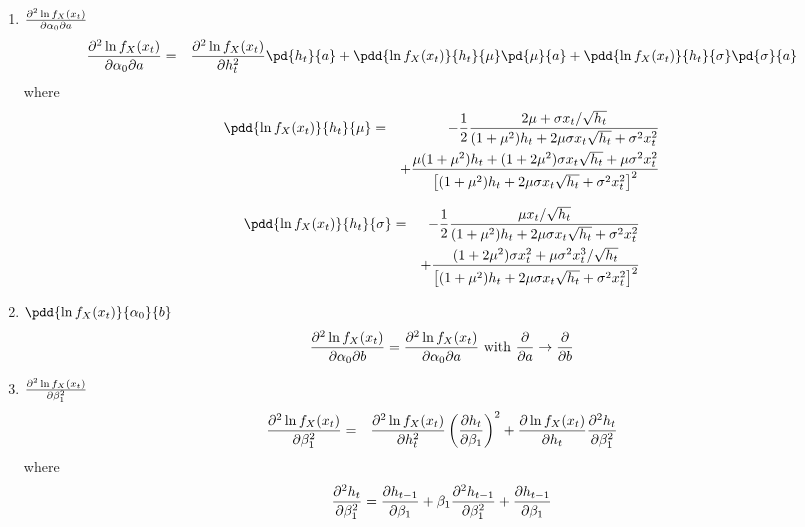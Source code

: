 \documentclass{book}
\begin{document}
\begin{enumerate}
\item ${\partial^2 \ln f_X(x_t)  \over  \partial \alpha_0 \partial a}$
  \begin{eqnarray*}
    {\partial^2 \ln f_X(x_t) \over \partial \alpha_0 \partial a} &=&
    {\partial^2 \ln f_X(x_t) \over \partial h_t^2}
    \pd{h_t}{a}
    + \pdd{\ln f_X(x_t)}{h_t}{\mu} \pd{\mu}{a}
    + \pdd{\ln f_X(x_t)}{h_t}{\sigma} \pd{\sigma}{a}\\
  \end{eqnarray*}
  where
  \begin{eqnarray*}
    \pdd{\ln f_X(x_t)}{h_t}{\mu} &=&
    -{1 \over 2} {2\mu + \sigma x_t / \sqrt{h_t} \over
      (1 + \mu^2) h_t + 2\mu \sigma x_t \sqrt{h_t} + \sigma^2 x_t^2
    } \\
    &&
    + {\mu(1 + \mu^2) h_t +
      (1 + 2\mu^2) \sigma x_t \sqrt{h_t} +
      \mu\sigma^2x_t^2
      \over
      \left[
        (1 + \mu^2) h_t + 2\mu \sigma x_t \sqrt{h_t} + \sigma^2 x_t^2
      \right]^2
    }
  \end{eqnarray*}

  \begin{eqnarray*}
    \pdd{\ln f_X(x_t)}{h_t}{\sigma} &=&
    -{1 \over 2} {\mu x_t / \sqrt{h_t}  \over
      (1 + \mu^2) h_t + 2\mu \sigma x_t \sqrt{h_t} + \sigma^2 x_t^2
    } \\
    &&
    + {
      (1 + 2\mu^2)\sigma x_t^2 + \mu\sigma^2 x_t^3 / \sqrt{h_t}
      \over
      \left[
        (1 + \mu^2) h_t + 2\mu \sigma x_t \sqrt{h_t} + \sigma^2 x_t^2
      \right]^2
    }
  \end{eqnarray*}

\item $\pdd{\ln f_X(x_t)}{\alpha_0}{b}$
  \begin{equation*}
    {\partial^2 \ln f_X(x_t) \over \partial \alpha_0 \partial b} =
    {\partial^2 \ln f_X(x_t) \over \partial \alpha_0 \partial a}
    \text{ with } {\partial \over \partial a} \to {\partial \over \partial b}
  \end{equation*}

\item $\partial^2 \ln f_X(x_t) \over \partial \beta_1^2$
  \begin{eqnarray*}
    {\partial^2 \ln f_X(x_t) \over \partial \beta_1^2} &=&
    {\partial^2 \ln f_X(x_t) \over \partial h_t^2} \left(
      {\partial h_t \over \partial \beta_1}
    \right)^2 + {\partial \ln f_X(x_t) \over \partial h_t}
    {\partial^2 h_t \over \partial \beta_1^2}
  \end{eqnarray*}
  where
  \begin{equation*}
    {\partial^2 h_t \over \partial \beta_1^2} =
    {\partial h_{t-1} \over \partial \beta_1}
    + \beta_1 {\partial^2 h_{t-1} \over \partial \beta_1^2}
    + {\partial h_{t-1} \over \partial \beta_1}
  \end{equation*}


\end{enumerate}
\end{document}
